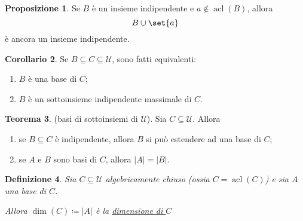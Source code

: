 \documentclass[10pt]{article}
\newcommand{\card}[1]{\left\vert #1 \right\vert}
\newcommand{\1}{\mathds{1}}
\theoremstyle{definition}%
\newtheorem{thm}{Teorema}[section]
\newtheorem{prop}[thm]{Proposizione}
\newtheorem{cor}[thm]{Corollario}
\theoremstyle{plain}
\newtheorem{definizione}[thm]{Definizione}
\theoremstyle{remark}
\begin{document}
\begin{prop}
Se \(B\) è un insieme indipendente e \(a \notin \operatorname{acl}(B)\), allora
\begin{equation*}
B\cup\set{a}
\end{equation*}
è ancora un insieme indipendente.
\end{prop}
\begin{cor}
Se \(B \subseteq C \subseteq \mathcal{U}\), sono fatti equivalenti:
\begin{enumerate}
\item \(B\) è una base di \(C\);
\item \(B\) è un sottoinsieme indipendente massimale di \(C\).
\end{enumerate}
\end{cor}

\begin{thm}
(basi di sottoinsiemi di \(\mathcal{U}\)). Sia \(C \subseteq \mathcal{U}\). Allora
\begin{enumerate}
\item se \(B \subseteq C\) è indipendente, allora \(B\) si può estendere ad una base di \(C\);
\item se \(A\) e \(B\) sono basi di \(C\), allora \(\card{A}=\card{B}\).
\end{enumerate}
\end{thm}
\begin{definizione}
Sia \(C \subseteq \mathcal{U}\) algebricamente chiuso (ossia \(C=\operatorname{acl}(C)\)) e sia \(A\) una base di \(C\).

Allora \(\operatorname{dim}(C)\coloneqq\card{A}\) è la \uline{dimensione di \(C\)}
\end{definizione}
\end{document}
